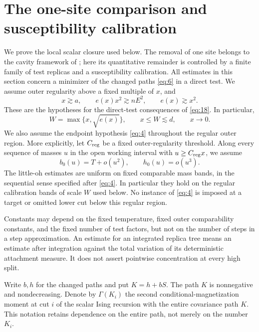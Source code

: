 \section{The one-site comparison and susceptibility calibration}\label{sec:cavity}

We prove the local scalar closure used below. The removal of one site
belongs to the cavity framework of \cite{AizenmanSimsStarr2003}; here
its quantitative remainder is controlled by a finite family of test
replicas and a susceptibility calibration. All estimates in this
section concern a minimizer of the changed paths \eqref{eq:6}
in a direct test. We assume outer regularity above a fixed multiple
of \(x\), and
\[
             x\gtrsim a,\qquad e(x)x^2\gtrsim nE^2,
                                      \qquad e(x)\gtrsim x^2.
\]
These are the hypotheses for the direct-test consequences of
\eqref{eq:18}. In particular,
\[
 W=\max\{x,\sqrt{e(x)}\},\qquad x\le W\lesssim d,\qquad x\longrightarrow0.
\]
We also assume the endpoint hypothesis \eqref{eq:4}
throughout the regular outer region. More explicitly,
let \(C_{\rm reg}\) be a fixed outer-regularity threshold.
Along every sequence of masses \(u\) in the open working
interval with \(u\ge C_{\rm reg}x\), we assume
\[
                  b_0(u)=T+o(u^2),\qquad h_0(u)=o(u^3).
\]
The little-oh estimates are uniform on fixed comparable
mass bands, in the sequential sense specified after
\eqref{eq:4}. In particular they hold on the regular
calibration bands of scale \(W\) used below. No instance
of \eqref{eq:4} is imposed at a target or omitted lower
cut below this regular region.

Constants may depend on the fixed temperature, fixed outer
comparability constants, and the fixed number of test factors, but not
on the number of steps in a step approximation. An estimate for an
integrated replica tree means an estimate after integration against
the total variation of its deterministic attachment measure. It does
not assert pointwise concentration at every high split.

Write \(b,h\) for the changed paths and put \(K=h+bS\).
The path \(K\) is nonnegative and nondecreasing. Denote by
\(\Gamma(K_i)\) the second conditional-magnetization moment at cut
\(i\) of the scalar Ising recursion with the entire covariance path
\(K\). This notation retains dependence on the entire path, not
merely on the number \(K_i\).

